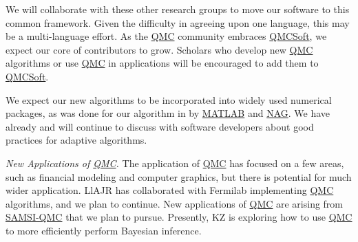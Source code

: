 \documentclass[11pt]{NSFamsart}
\newcommand{\QMCSoft}{\hyperlink{QMCSoftlink}{QMCSoft}\xspace}
\newcommand{\QMC}{\hyperlink{QMClink}{QMC}\xspace}
\newcommand{\SAMSIQMC}{\hyperlink{SAMSIlink}{SAMSI-QMC}\xspace}
\newcommand{\NAG}{\hyperlink{NAGlink}{NAG}\xspace}
\newcommand{\MATLAB}{\hyperlink{MATLABlink}{MATLAB}\xspace}
\begin{document}
We will collaborate with these other research groups to move our software to this common framework.  Given the difficulty in agreeing upon one language, this may be a multi-language effort.  As the \QMC community embraces \QMCSoft, we expect our core of contributors to grow.  Scholars who develop new \QMC algorithms or use \QMC in applications will be encouraged to add them to \QMCSoft.  

We expect our new algorithms to be incorporated into widely used numerical packages, as was done for our algorithm in \cite{HonHic00a} by \MATLAB and \NAG.  We have already and will continue 
to discuss with software developers about good practices for adaptive algorithms.


\emph{New Applications of \QMC.}
The application of \QMC has focused on a few areas, such as financial modeling and computer 
graphics, but there is potential for much wider application.  LlAJR has collaborated with Fermilab implementing \QMC algorithms, and we plan to continue.    New applications of \QMC are arising from \SAMSIQMC that we plan to pursue.  Presently, KZ is exploring how to use \QMC to more efficiently perform Bayesian inference.



\newpage
\clearpage
\setcounter{page}{1}




{\renewcommand\addcontentsline[3]{} 
\renewcommand{\refname}{{\Large\textbf{References Cited}}}                   %
\renewcommand{\bibliofont}{\normalsize}

}
\end{document}
